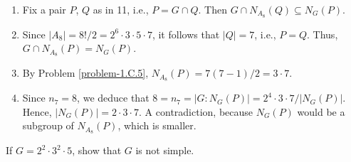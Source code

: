 \begin{solution}
\begin{enumerate}[\rm1.]
    \item Fix a pair $P$, $Q$ as in 11, i.e., $P=G\cap Q$. Then $G\cap N_{A_8}(Q)\subseteq N_G(P)$.
    \item Since $|A_8|=8!/2 = 2^6\cdot3\cdot5\cdot7$, it follows that $|Q|=7$, i.e., $P=Q$. Thus, $G\cap N_{A_8}(P)=N_G(P)$.
    \item By Problem \ref{problem-1.C.5}, $N_{A_8}(P)=7(7-1)/2=3\cdot7$.
    \item Since $n_7=8$, we deduce that $8=n_7=|G:N_G(P)|=2^4\cdot3\cdot7/|N_G(P)|$. Hence, $|N_G(P)|=2\cdot3\cdot7$. A contradiction, because $N_G(P)$ would be a subgroup of $N_{A_8}(P)$, which is smaller.
\end{enumerate}
\end{solution}

\begin{probl}
    If\/ $G=2^2\cdot3^2\cdot5$, show that\/ $G$ is not simple.
\end{probl}

